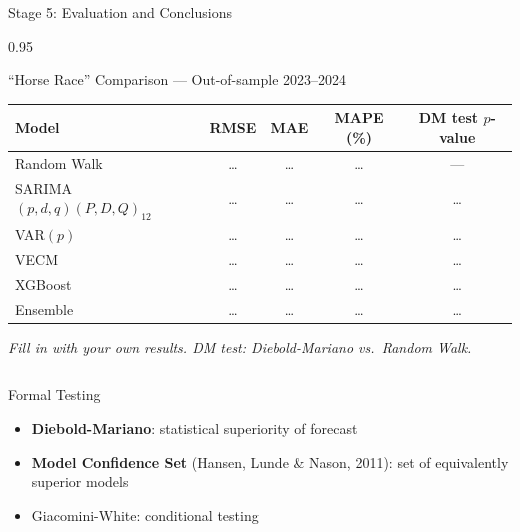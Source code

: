 \documentclass[9pt, aspectratio=169, t]{beamer}
\begin{document}
\begin{frame}{Stage 5: Evaluation and Conclusions}
    \vspace{-0.3cm}
    \begin{cminipage}{0.95\textwidth}
        {\scriptsize
        \begin{block}{``Horse Race'' Comparison --- Out-of-sample 2023--2024}
            \vspace{-0.1cm}
            \begin{center}
            \begin{tabular}{@{}l c c c c@{}}
                \toprule
                \textbf{Model} & \textbf{RMSE} & \textbf{MAE} & \textbf{MAPE (\%)} & \textbf{DM test $p$-value} \\
                \midrule
                Random Walk & \ldots & \ldots & \ldots & --- \\
                SARIMA$(p,d,q)(P,D,Q)_{12}$ & \ldots & \ldots & \ldots & \ldots \\
                VAR$(p)$ & \ldots & \ldots & \ldots & \ldots \\
                VECM & \ldots & \ldots & \ldots & \ldots \\
                XGBoost & \ldots & \ldots & \ldots & \ldots \\
                Ensemble & \ldots & \ldots & \ldots & \ldots \\
                \bottomrule
            \end{tabular}
            \end{center}
            \vspace{-0.2cm}
            \hfill{\tiny \textit{Fill in with your own results. DM test: Diebold-Mariano vs.\ Random Walk.}}
        \end{block}
        }

        \vspace{-0.05cm}

        {\scriptsize
        \begin{columns}[T]
            \begin{exampleblock}{Formal Testing}
                \begin{itemize}\setlength{\itemsep}{0pt}
                    \item \textbf{Diebold-Mariano}: statistical superiority of forecast
                    \item \textbf{Model Confidence Set} (Hansen, Lunde \& Nason, 2011): set of equivalently superior models
                    \item Giacomini-White: conditional testing
                \end{itemize}
            \end{exampleblock}


\end{columns}}
\end{cminipage}
\end{frame}
\end{document}
